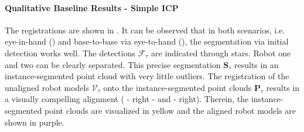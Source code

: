 \paragraph{Qualitative Baseline Results - Simple ICP} The registrations are shown in . It can be observed that in both scenarios, i.e. eye-in-hand () and base-to-base via eye-to-hand (), the segmentation via initial detection works well. The detections $\mathcal{F}_\tau$ are indicated through stars. Robot one and two can be clearly separated. This precise segmentation $\mathbf{S}_\tau$ results in an instance-segmented point cloud with very little outliers. The registration of the unaligned robot models $\mathcal{V}_\tau$ onto the instance-segmented point clouds $\mathbf{P}_\tau$ results in a visually compelling alignment ( - right - and  - right). Therein, the instance-segmented point clouds are visualized in yellow and the aligned robot models are shown in purple.

